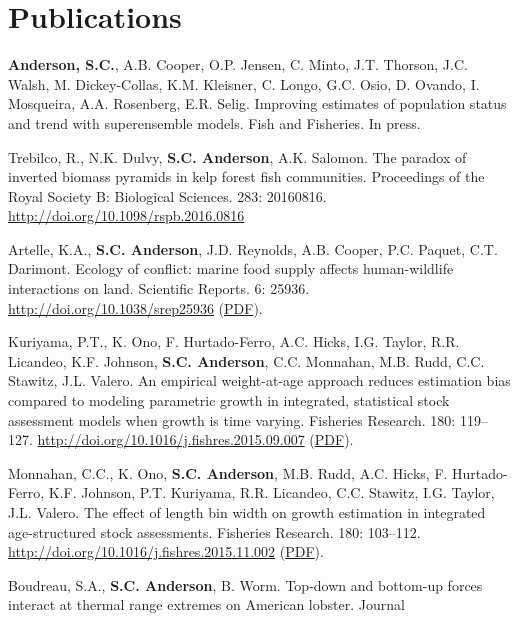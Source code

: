 \section{Publications}\label{publications}

\begin{description}
\tightlist
\item[2016]
\textbf{Anderson, S.C.}, A.B. Cooper, O.P. Jensen, C. Minto, J.T.
Thorson, J.C. Walsh, M. Dickey-Collas, K.M. Kleisner, C. Longo, G.C.
Osio, D. Ovando, I. Mosqueira, A.A. Rosenberg, E.R. Selig. Improving
estimates of population status and trend with superensemble models. Fish
and Fisheries. In press.
\item[2016]
Trebilco, R., N.K. Dulvy, \textbf{S.C. Anderson}, A.K. Salomon. The
paradox of inverted biomass pyramids in kelp forest fish communities.
Proceedings of the Royal Society B: Biological Sciences. 283: 20160816.
\url{http://doi.org/10.1098/rspb.2016.0816}
\item[2016]
Artelle, K.A., \textbf{S.C. Anderson}, J.D. Reynolds, A.B. Cooper, P.C.
Paquet, C.T. Darimont. Ecology of conflict: marine food supply affects
human-wildlife interactions on land. Scientific Reports. 6: 25936.
\url{http://doi.org/10.1038/srep25936}
(\href{http://www.nature.com/articles/srep25936.pdf}{PDF}).
\item[2016]
Kuriyama, P.T., K. Ono, F. Hurtado-Ferro, A.C. Hicks, I.G. Taylor, R.R.
Licandeo, K.F. Johnson, \textbf{S.C. Anderson}, C.C. Monnahan, M.B.
Rudd, C.C. Stawitz, J.L. Valero. An empirical weight-at-age approach
reduces estimation bias compared to modeling parametric growth in
integrated, statistical stock assessment models when growth is time
varying. Fisheries Research. 180: 119--127.
\url{http://doi.org/10.1016/j.fishres.2015.09.007}
(\href{https://dl.dropboxusercontent.com/u/254940/papers/Kuriyama_etal_2016_empirical.pdf}{PDF}).
\item[2016]
Monnahan, C.C., K. Ono, \textbf{S.C. Anderson}, M.B. Rudd, A.C. Hicks,
F. Hurtado-Ferro, K.F. Johnson, P.T. Kuriyama, R.R. Licandeo, C.C.
Stawitz, I.G. Taylor, J.L. Valero. The effect of length bin width on
growth estimation in integrated age-structured stock assessments.
Fisheries Research. 180: 103--112.
\url{http://doi.org/10.1016/j.fishres.2015.11.002}
(\href{https://dl.dropboxusercontent.com/u/254940/papers/Monnahan_etal_2016_binwidth.pdf}{PDF}).
\item[2015]
Boudreau, S.A., \textbf{S.C. Anderson}, B. Worm. Top-down and bottom-up
forces interact at thermal range extremes on American lobster. Journal

\end{description}
